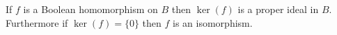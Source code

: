 If $f$ is a Boolean homomorphism on $B$ then $\ker(f)$ is a proper ideal in $B$. Furthermore if $\ker(f) = \{0\}$ then $f$ is an isomorphism.
